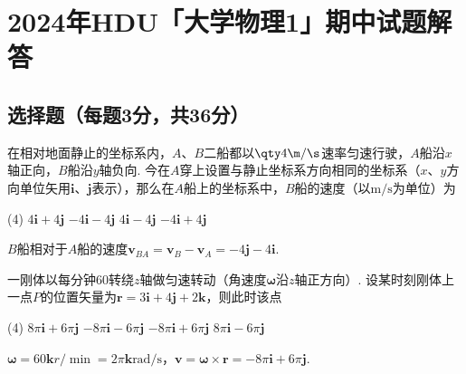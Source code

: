 \chapter*{2024年\textsf{HDU}「大学物理1」期中试题解答}



\section{选择题（每题3分，共36分）}

\begin{problem}
    在相对地面静止的坐标系内，$A$、$B$二船都以$\qty4{\m/\s}$速率匀速行驶，$A$船沿$x$轴正向，$B$船沿$y$轴负向. 今在$A$穿上设置与静止坐标系方向相同的坐标系（$x$、$y$方向单位矢用$\bm i$、$\bm j$表示），那么在$A$船上的坐标系中，$B$船的速度（以$\unit{\m/\s}$为单位）为
    \begin{tasks}(4)
        \task $4\bm i+4\bm j$
        \task[\true] $-4\bm i-4\bm j$
        \task $4\bm i-4\bm j$
        \task $-4\bm i+4\bm j$
    \end{tasks}
\end{problem}
\begin{solution}
    $B$船相对于$A$船的速度$\bm v_{BA}=\bm v_B-\bm v_A=-4\bm j-4\bm i$.
\end{solution}

\begin{problem}
    一刚体以每分钟$60$转绕$z$轴做匀速转动（角速度$\bm\omega$沿$z$轴正方向）. 设某时刻刚体上一点$P$的位置矢量为$\bm r=3\bm i+4\bm j+2\bm k$，则此时该点
    \begin{tasks}(4)
        \task $8\pi\bm i+6\pi\bm j$
        \task $-8\pi\bm i-6\pi\bm j$
        \task[\true] $-8\pi\bm i+6\pi\bm j$
        \task $8\pi\bm i-6\pi\bm j$
    \end{tasks}
\end{problem}
\begin{solution}
    $\bm\omega=60\bm k\unit{r/\min}=2\pi\bm k\unit{\radian/\s}$，$\bm v=\bm\omega\times\bm r=-8\pi\bm i+6\pi\bm j$.
\end{solution}


